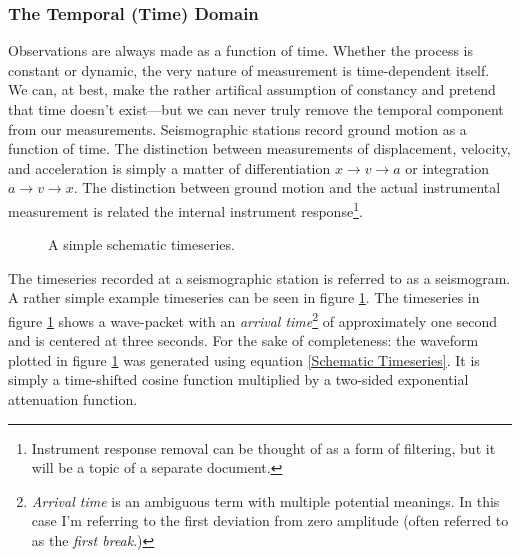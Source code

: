 \documentclass[american, twoside]{article}
\begin{document}
\subsubsection{The Temporal (Time) Domain} \label{Background:Math:Temporal}
Observations are always made as a function of time. Whether the process is constant or dynamic, the very nature of measurement is time-dependent itself. We can, at best, make the
rather artifical assumption of constancy and pretend that time doesn't exist---but we can never truly remove the temporal component from our measurements. Seismographic stations
record ground motion as a function of time. The distinction between measurements of displacement, velocity, and acceleration is simply a matter of differentiation $x\rightarrow v\rightarrow a$
or integration $a\rightarrow v \rightarrow x$. The distinction between ground motion and the actual instrumental measurement is related the internal instrument response\footnote{Instrument
response removal can be thought of as a form of filtering, but it will be a topic of a separate document.}.

\begin{center}
    \begin{figure}[ht]
        \label{figure:1}
        \caption[Schematic timeseries]{A simple schematic timeseries.}
    \end{figure}
\end{center}

The timeseries recorded at a seismographic station is referred to as a seismogram. A rather simple example timeseries can be seen in figure \ref{figure:1}.
The timeseries in figure \ref{figure:1} shows a wave-packet with an \textit{arrival time}\footnote{\textit{Arrival time} is an ambiguous term with multiple
potential meanings. In this case I'm referring to the first deviation from zero amplitude (often referred to as the \textit{first break}.)} of approximately one second
and is centered at three seconds. For the sake of completeness: the waveform plotted in figure \ref{figure:1} was generated using equation \ref{Schematic Timeseries}.
It is simply a time-shifted cosine function multiplied by a two-sided exponential attenuation function.
\end{document}
